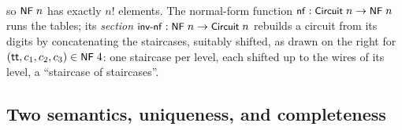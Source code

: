 \begin{center}
\begin{minipage}[c]{0.66\linewidth}
\begingroup\setlength{\mathindent}{0pt}
\begin{code}%
\>[0]\AgdaSpace{}%
\AgdaSymbol{:}\AgdaSpace{}%
\AgdaSpace{}%
\AgdaSpace{}%
\<%
\\
\>[0]\AgdaSpace{}%
%
\>[11]\AgdaSymbol{=}\AgdaSpace{}%
\<%
\\
\>[0]\AgdaSpace{}%
%
\>[11]\AgdaSymbol{=}\AgdaSpace{}%
\<%
\\
\>[0]\AgdaSpace{}%
\AgdaSymbol{(}\AgdaSpace{}%
\AgdaSymbol{)}%
\>[11]\AgdaSymbol{=}\AgdaSpace{}%
\AgdaSpace{}%
\AgdaSymbol{(}\AgdaSpace{}%
\AgdaSymbol{)}\AgdaSpace{}%
\AgdaSpace{}%
\AgdaSpace{}%
\AgdaSymbol{(}\AgdaSpace{}%
\AgdaSymbol{)}%
\>[36]\<%
\end{code}
\endgroup
\end{minipage}\hspace{1.5em}%
\begin{minipage}[c]{0.16\linewidth}\centering
\end{minipage}
\end{center}

\noindent so $\mbox{\textsf{\small NF}}\;n$ has exactly $n!$ elements.  The normal-form
function $\mbox{\textsf{\small nf}} : \mbox{\textsf{\small Circuit}}\;n \to \mbox{\textsf{\small NF}}\;n$ runs the tables;
its \emph{section} $\mbox{\textsf{\small inv-nf}} : \mbox{\textsf{\small NF}}\;n \to \mbox{\textsf{\small Circuit}}\;n$
rebuilds a circuit from its digits by concatenating the staircases,
suitably shifted, as drawn on the right for $(\mathsf{tt}, c_1, c_2, c_3)
\in \mbox{\textsf{\small NF}}\;4$: one staircase per level, each shifted up to the
wires of its level, a ``staircase of staircases''.

\subsection{Two semantics, uniqueness, and completeness}

